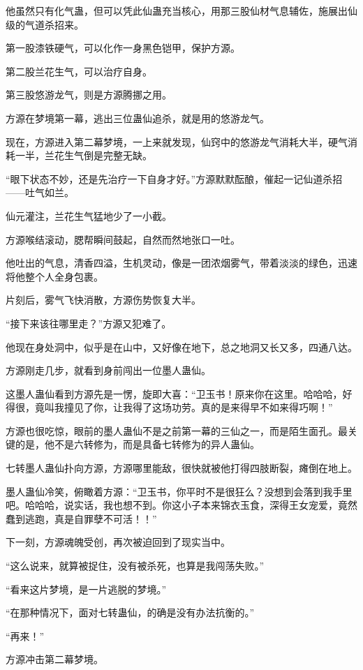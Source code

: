 \begin{this_body}
他虽然只有化气蛊，但可以凭此仙蛊充当核心，用那三股仙材气息辅佐，施展出仙级的气道杀招来。

第一股漆铁硬气，可以化作一身黑色铠甲，保护方源。

第二股兰花生气，可以治疗自身。

第三股悠游龙气，则是方源腾挪之用。

方源在梦境第一幕，逃出三位蛊仙追杀，就是用的悠游龙气。

现在，方源进入第二幕梦境，一上来就发现，仙窍中的悠游龙气消耗大半，硬气消耗一半，兰花生气倒是完整无缺。

“眼下状态不妙，还是先治疗一下自身才好。”方源默默酝酿，催起一记仙道杀招——吐气如兰。

仙元灌注，兰花生气猛地少了一小截。

方源喉结滚动，腮帮瞬间鼓起，自然而然地张口一吐。

他吐出的气息，清香四溢，生机灵动，像是一团浓烟雾气，带着淡淡的绿色，迅速将他整个人全身包裹。

片刻后，雾气飞快消散，方源伤势恢复大半。

“接下来该往哪里走？”方源又犯难了。

他现在身处洞中，似乎是在山中，又好像在地下，总之地洞又长又多，四通八达。

方源刚走几步，就看到身前闯出一位墨人蛊仙。

这墨人蛊仙看到方源先是一愣，旋即大喜：“卫玉书！原来你在这里。哈哈哈，好得很，竟叫我撞见了你，让我得了这场功劳。真的是来得早不如来得巧啊！”

方源也很吃惊，眼前的墨人蛊仙不是之前第一幕的三仙之一，而是陌生面孔。最关键的是，他不是六转修为，而是具备七转修为的异人蛊仙。

七转墨人蛊仙扑向方源，方源哪里能敌，很快就被他打得四肢断裂，瘫倒在地上。

墨人蛊仙冷笑，俯瞰着方源：“卫玉书，你平时不是很狂么？没想到会落到我手里吧。哈哈哈，说实话，我也想不到。你这小子本来锦衣玉食，深得王女宠爱，竟然蠢到逃跑，真是自罪孽不可活！！”

下一刻，方源魂魄受创，再次被迫回到了现实当中。

“这么说来，就算被捉住，没有被杀死，也算是我闯荡失败。”

“看来这片梦境，是一片逃脱的梦境。”

“在那种情况下，面对七转蛊仙，的确是没有办法抗衡的。”

“再来！”

方源冲击第二幕梦境。


\end{this_body}
